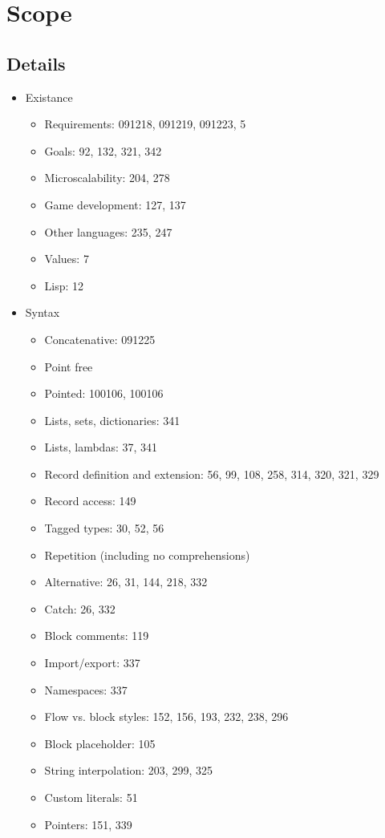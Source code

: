\chapter{Scope}

\section{Details}
\begin{itemize}
\item Existance
  \begin{itemize}
  \item Requirements: 091218, 091219, 091223, 5
  \item Goals: 92, 132, 321, 342
  \item Microscalability: 204, 278
  \item Game development: 127, 137
  \item Other languages: 235, 247
  \item Values: 7
  \item Lisp: 12
  \end{itemize}
\item Syntax
  \begin{itemize}
  \item Concatenative: 091225
  \item Point free
  \item Pointed: 100106, 100106
  \item Lists, sets, dictionaries: 341
  \item Lists, lambdas: 37, 341
  \item Record definition and extension: 56, 99, 108, 258, 314, 320, 321, 329
  \item Record access: 149
  \item Tagged types: 30, 52, 56
  \item Repetition (including no comprehensions)
  \item Alternative: 26, 31, 144, 218, 332
  \item Catch: 26, 332
  \item Block comments: 119
  \item Import/export: 337
  \item Namespaces: 337
  \item Flow vs. block styles: 152, 156, 193, 232, 238, 296
  \item Block placeholder: 105
  \item String interpolation: 203, 299, 325
  \item Custom literals: 51
  \item Pointers: 151, 339

\end{itemize}
\end{itemize}
